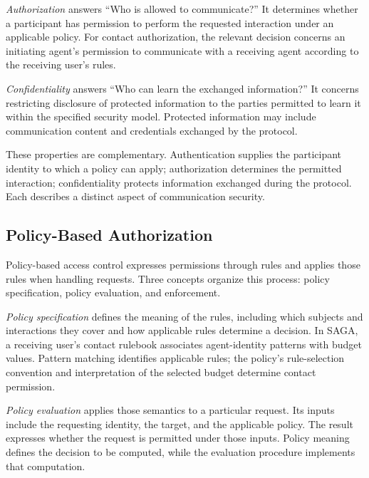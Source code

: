 \emph{Authorization} answers ``Who is allowed to communicate?'' It determines
whether a participant has permission to perform the requested interaction
under an applicable policy. For contact authorization, the relevant decision
concerns an initiating agent's permission to communicate with a receiving
agent according to the receiving user's rules.

\emph{Confidentiality} answers ``Who can learn the exchanged information?''
It concerns restricting disclosure of protected information to the parties
permitted to learn it within the specified security model. Protected
information may include communication content and credentials exchanged by
the protocol.

These properties are complementary. Authentication supplies the participant
identity to which a policy can apply; authorization determines the permitted
interaction; confidentiality protects information exchanged during the
protocol. Each describes a distinct aspect of communication security.

\subsection{Policy-Based Authorization}

Policy-based access control expresses permissions through rules and applies
those rules when handling requests. Three concepts organize this process:
policy specification, policy evaluation, and enforcement.

\emph{Policy specification} defines the meaning of the rules, including which
subjects and interactions they cover and how applicable rules determine a
decision. In SAGA, a receiving user's contact rulebook associates agent-identity
patterns with budget values. Pattern matching identifies applicable rules;
the policy's rule-selection convention and interpretation of the selected
budget determine contact permission.

\emph{Policy evaluation} applies those semantics to a particular request.
Its inputs include the requesting identity, the target, and the applicable
policy. The result expresses whether the request is permitted under those
inputs. Policy meaning defines the decision to be computed, while the
evaluation procedure implements that computation.


